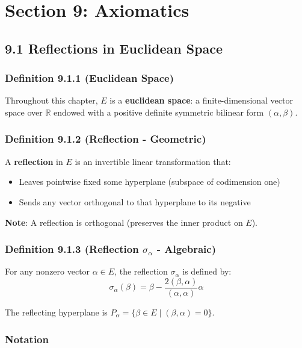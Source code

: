 \section{Section 9: Axiomatics}

\subsection{9.1 Reflections in Euclidean Space}

\subsubsection{Definition 9.1.1 (Euclidean Space)}

Throughout this chapter, $E$ is a \textbf{euclidean space}: a finite-dimensional vector space over $\mathbb{R}$ endowed with a positive definite symmetric bilinear form $(\alpha, \beta)$.

\subsubsection{Definition 9.1.2 (Reflection - Geometric)}

A \textbf{reflection} in $E$ is an invertible linear transformation that:

\begin{itemize}
	\item Leaves pointwise fixed some hyperplane (subspace of codimension one)
	\item Sends any vector orthogonal to that hyperplane to its negative
\end{itemize}

\textbf{Note}: A reflection is orthogonal (preserves the inner product on $E$).

\subsubsection{Definition 9.1.3 (Reflection \texorpdfstring{$\sigma_\alpha$}{sigma_alpha} - Algebraic)}

For any nonzero vector $\alpha \in E$, the reflection $\sigma_\alpha$ is defined by:
\[
\sigma_\alpha(\beta) = \beta - \frac{2(\beta, \alpha)}{(\alpha, \alpha)} \alpha
\]

The reflecting hyperplane is $P_\alpha = \{\beta \in E \mid (\beta, \alpha) = 0\}$.

\subsubsection{Notation}

